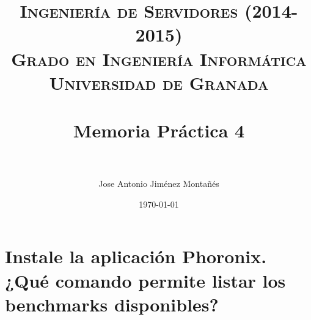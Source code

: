 

\usepackage[pdftex,colorlinks=true,linkcolor=negro,urlcolor=blue]{hyperref,xcolor}

\graphicspath{ {./imagenes/} }
\usepackage{subfig}
\hypersetup{citecolor=blue}

\title{	
\normalfont \normalsize 
\textsc{{\bf Ingeniería de Servidores (2014-2015)} \\ Grado en Ingeniería Informática \\ Universidad de Granada} \\ [25pt]
\horrule{0.5pt} \\[0.4cm] %
\huge Memoria Práctica 4 \\ %
\horrule{2pt} \\[0.5cm] %
}

\author{Jose Antonio Jiménez Montañés}

\date{\normalsize\today}

%






\maketitle %

\newpage %

\tableofcontents %
\clearpage
\listoffigures


\newpage

\section{Instale la aplicación Phoronix. ¿Qué comando permite listar los benchmarks disponibles?}

